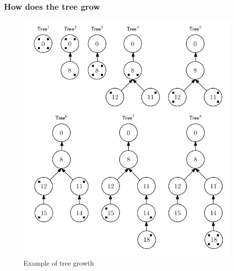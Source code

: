 \documentclass[11pt]{article}
\begin{document}
\subsubsection{How does the tree grow}
\label{sec:org6d9cc2d}
\begin{figure}[htbp]
\centering
\includegraphics[width=.9\linewidth]{Blockchains/screenshot_2018-10-28_10-58-41.png}
\caption{\label{fig:orga27d636}
Example of tree growth}
\end{figure}
\end{document}
